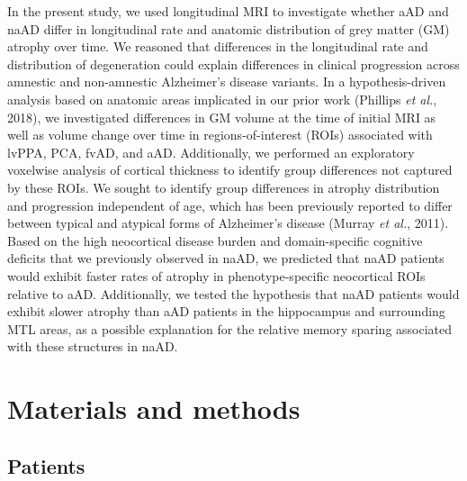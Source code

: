 \documentclass[]{article}
\begin{document}
In the present study, we used longitudinal MRI to investigate whether
aAD and naAD differ in longitudinal rate and anatomic distribution of
grey matter (GM) atrophy over time. We reasoned that differences in the
longitudinal rate and distribution of degeneration could explain
differences in clinical progression across amnestic and non-amnestic
Alzheimer's disease variants. In a hypothesis-driven analysis based on
anatomic areas implicated in our prior work (Phillips \emph{et al.},
2018), we investigated differences in GM volume at the time of initial
MRI as well as volume change over time in regions-of-interest (ROIs)
associated with lvPPA, PCA, fvAD, and aAD. Additionally, we performed an
exploratory voxelwise analysis of cortical thickness to identify group
differences not captured by these ROIs. We sought to identify group
differences in atrophy distribution and progression independent of age,
which has been previously reported to differ between typical and
atypical forms of Alzheimer's disease (Murray \emph{et al.}, 2011).
Based on the high neocortical disease burden and domain-specific
cognitive deficits that we previously observed in naAD, we predicted
that naAD patients would exhibit faster rates of atrophy in
phenotype-specific neocortical ROIs relative to aAD. Additionally, we
tested the hypothesis that naAD patients would exhibit slower atrophy
than aAD patients in the hippocampus and surrounding MTL areas, as a
possible explanation for the relative memory sparing associated with
these structures in naAD.

\section*{Materials and methods}\label{materials-and-methods}

\subsection*{Patients}\label{patients}
\end{document}
